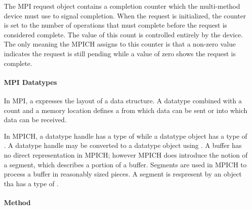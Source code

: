 \begin{comment}
  Is this mapping of objects to types true for requests?  They appear to be
  treated differently that other MPI types in the design document.
\end{comment}

The MPI request object contains a completion counter which the multi-method
device must use to signal completion.  When the request is initialized, the
counter is set to the number of operations that must complete before the
request is considered complete.  The value of this count is controlled entirely
by the device.  The only meaning the MPICH assigns to this counter is that a
non-zero value indicates the request is still pending while a value of zero
shows the request is complete.

\paragraph{MPI Datatypes}

In MPI, a  expresses the layout of a data structure.  A datatype
combined with a count and a memory location defines a  from which
data can be sent or into which data can be received.

In MPICH, a datatype handle has a type of  while a datatype
object has a type of .  A datatype handle may be converted
to a datatype object using .  A buffer has no
direct representation in MPICH; however MPICH does introduce the notion of a
segment, which describes a portion of a buffer.  Segments are used in MPICH to
process a buffer in reasonably sized pieces.  A segment is respresent by an
object tha has a type of .

\paragraph{Method}


